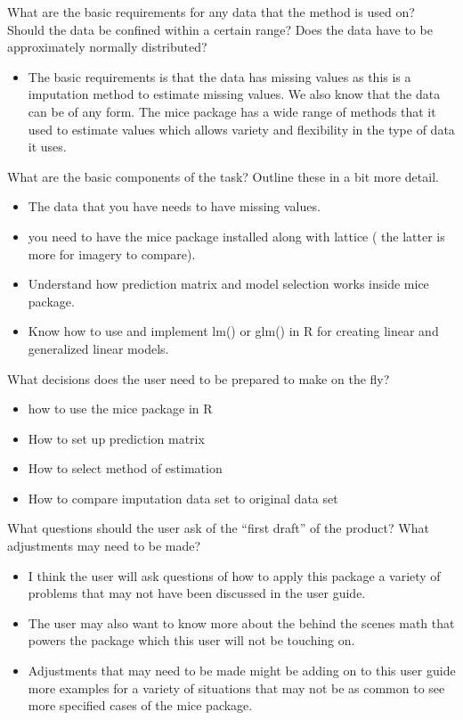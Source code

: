 \documentclass[
  letterpaper,
  DIV=11,
  numbers=noendperiod]{scrreprt}
\providecommand{\tightlist}{%
  \setlength{\itemsep}{0pt}\setlength{\parskip}{0pt}}\usepackage{longtable,booktabs,array}
\begin{document}
What are the basic requirements for any data that the method is used on?
Should the data be confined within a certain range? Does the data have
to be approximately normally distributed?

\begin{itemize}
\tightlist
\item
  The basic requirements is that the data has missing values as this is
  a imputation method to estimate missing values. We also know that the
  data can be of any form. The mice package has a wide range of methods
  that it used to estimate values which allows variety and flexibility
  in the type of data it uses.
\end{itemize}

What are the basic components of the task? Outline these in a bit more
detail.

\begin{itemize}
\item
  The data that you have needs to have missing values.
\item
  you need to have the mice package installed along with lattice ( the
  latter is more for imagery to compare).
\item
  Understand how prediction matrix and model selection works inside mice
  package.
\item
  Know how to use and implement lm() or glm() in R for creating linear
  and generalized linear models.
\end{itemize}

What decisions does the user need to be prepared to make on the fly?

\begin{itemize}
\tightlist
\item
  how to use the mice package in R
\item
  How to set up prediction matrix
\item
  How to select method of estimation
\item
  How to compare imputation data set to original data set
\end{itemize}

What questions should the user ask of the ``first draft'' of the
product? What adjustments may need to be made?

\begin{itemize}
\item
  I think the user will ask questions of how to apply this package a
  variety of problems that may not have been discussed in the user
  guide.
\item
  The user may also want to know more about the behind the scenes math
  that powers the package which this user will not be touching on.
\item
  Adjustments that may need to be made might be adding on to this user
  guide more examples for a variety of situations that may not be as
  common to see more specified cases of the mice package.
\end{itemize}
\end{document}
